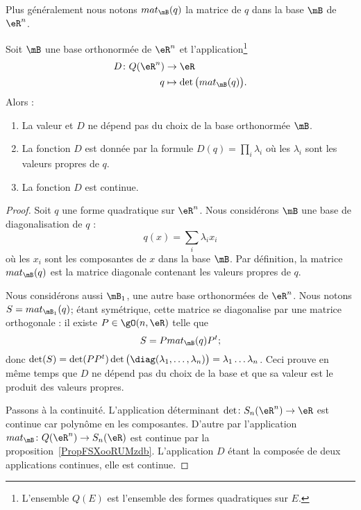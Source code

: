 Plus généralement nous notons \( mat_{\mB}(q)\) la matrice de \( q\) dans la base \( \mB\) de \( \eR^n\).

\begin{proposition} \label{PropOXWooYrDKpw}
    Soit \( \mB\) une base orthonormée de \( \eR^n\) et l'application\footnote{L'ensemble \( Q(E)\) est l'ensemble des formes quadratiques sur \( E\).}
    \begin{equation}
        \begin{aligned}
            D\colon Q(\eR^n)&\to \eR \\
            q&\mapsto \det\big( mat_{\mB}(q) \big) .
        \end{aligned}
    \end{equation}
    Alors :
    \begin{enumerate}
        \item
            La valeur et \( D\) ne dépend pas du choix de la base orthonormée \( \mB\).
        \item
            La fonction \( D\) est donnée par la formule \( D(q)=\prod_i\lambda_i\) où les \( \lambda_i\) sont les valeurs propres de \( q\).
        \item
            La fonction \( D\) est continue.
    \end{enumerate}
\end{proposition}

\begin{proof}
    Soit \( q\) une forme quadratique sur \( \eR^n\). Nous considérons \( \mB\) une base de diagonalisation de \( q\) :
    \begin{equation}
        q(x)=\sum_i\lambda_ix_i
    \end{equation}
    où les \( x_i\) sont les composantes de \( x\) dans la base \( \mB\). Par définition, la matrice \( mat_{\mB}(q)\) est la matrice diagonale contenant les valeurs propres de \( q\).

    Nous considérons aussi \( \mB_1\), une autre base orthonormées de \( \eR^n\). Nous notons \( S=mat_{\mB_1}(q)\); étant symétrique, cette matrice se diagonalise par une matrice orthogonale : il existe \( P\in\gO(n,\eR)\) telle que
    \begin{equation}
        S=P mat_{\mB}(q)P^t;
    \end{equation}
    donc \( \det(S)=\det(PP^t)\det\big( \diag(\lambda_1,\ldots, \lambda_n) \big)=\lambda_1\ldots\lambda_n\). Ceci prouve en même temps que \( D\) ne dépend pas du choix de la base et que sa valeur est le produit des valeurs propres.

    Passons à la continuité. L'application déterminant \( \det\colon S_n(\eR^n)\to \eR\) est continue car polynôme en les composantes. D'autre par l'application \( mat_{\mB}\colon Q(\eR^n)\to S_n(\eR)\) est continue par la proposition~\ref{PropFSXooRUMzdb}. L'application  \( D\) étant la composée de deux applications continues, elle est continue.
\end{proof}

